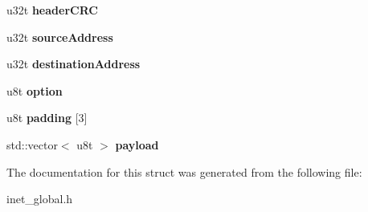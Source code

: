 \begin{DoxyCompactItemize}
\mbox{\label{structipv4__header__t_a056f1d4b637c9ac36f326690ab584ab3}} 
u32t {\bfseries header\+C\+RC}
\item 
\mbox{\label{structipv4__header__t_ade49e0bd0402fafc2f94d31277ebe6e3}} 
u32t {\bfseries source\+Address}
\item 
\mbox{\label{structipv4__header__t_a2b746f34fa839a18b548f8b950fdab61}} 
u32t {\bfseries destination\+Address}
\item 
\mbox{\label{structipv4__header__t_a86340594c0fd6d27fe9bbeeb129f31f2}} 
u8t {\bfseries option}
\item 
\mbox{\label{structipv4__header__t_a3e5bb6d694e89999c96e42576d7a052b}} 
u8t {\bfseries padding} \mbox{[}3\mbox{]}
\item 
\mbox{\label{structipv4__header__t_a6cb0f06ef984e798b7bfe4eeb11fa4d9}} 
std\+::vector$<$ u8t $>$ {\bfseries payload}
\end{DoxyCompactItemize}


The documentation for this struct was generated from the following file\+:\begin{DoxyCompactItemize}
\item 
inet\+\_\+global.\+h\end{DoxyCompactItemize}
